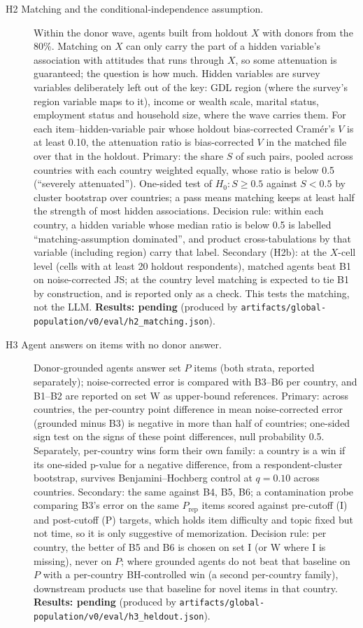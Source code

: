 \documentclass[10pt]{article}
\newcommand{\pending}[1]{\textbf{Results: pending} (produced by \nolinkurl{#1})}
\begin{document}
\begin{description}
  \item[H2 Matching and the conditional-independence assumption.] Within the donor wave, agents built from holdout $X$ with donors from the 80\%. Matching on $X$ can only carry the part of a hidden variable's association with attitudes that runs through $X$, so some attenuation is guaranteed; the question is how much. Hidden variables are survey variables deliberately left out of the key: GDL region (where the survey's region variable maps to it), income or wealth scale, marital status, employment status and household size, where the wave carries them. For each item--hidden-variable pair whose holdout bias-corrected Cramér's $V$ \citep{bergsma2013} is at least 0.10, the attenuation ratio is bias-corrected $V$ in the matched file over that in the holdout. Primary: the share $S$ of such pairs, pooled across countries with each country weighted equally, whose ratio is below 0.5 (``severely attenuated''). One-sided test of $H_0\!: S \ge 0.5$ against $S < 0.5$ by cluster bootstrap over countries; a pass means matching keeps at least half the strength of most hidden associations. Decision rule: within each country, a hidden variable whose median ratio is below 0.5 is labelled ``matching-assumption dominated'', and product cross-tabulations by that variable (including region) carry that label. Secondary (H2b): at the $X$-cell level (cells with at least 20 holdout respondents), matched agents beat B1 on noise-corrected JS; at the country level matching is expected to tie B1 by construction, and is reported only as a check. This tests the matching, not the LLM. \pending{artifacts/global-population/v0/eval/h2_matching.json}.
  \item[H3 Agent answers on items with no donor answer.] Donor-grounded agents answer set $P$ items (both strata, reported separately); noise-corrected error is compared with B3--B6 per country, and B1--B2 are reported on set W as upper-bound references. Primary: across countries, the per-country point difference in mean noise-corrected error (grounded minus B3) is negative in more than half of countries; one-sided sign test on the signs of these point differences, null probability 0.5. Separately, per-country wins form their own family: a country is a win if its one-sided p-value for a negative difference, from a respondent-cluster bootstrap, survives Benjamini--Hochberg control at $q = 0.10$ across countries. Secondary: the same against B4, B5, B6; a contamination probe comparing B3's error on the same $P_{\text{rep}}$ items scored against pre-cutoff (I) and post-cutoff (P) targets, which holds item difficulty and topic fixed but not time, so it is only suggestive of memorization. Decision rule: per country, the better of B5 and B6 is chosen on set I (or W where I is missing), never on $P$; where grounded agents do not beat that baseline on $P$ with a per-country BH-controlled win (a second per-country family), downstream products use that baseline for novel items in that country. \pending{artifacts/global-population/v0/eval/h3_heldout.json}.

\end{description}
\end{document}
